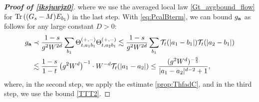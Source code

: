 \begin{proof}[\bf Proof of \eqref{iksjuwjx0}]
where we use the averaged local law \eqref{Gt_avgbound_flow} for $\operatorname{Tr}\left({(G_s-M)E_{b_1}}\right)$ in the last step. With \eqref{eq:PcalBterm}, we can bound $g_{{\mathbf{a}}}$ as follows for any large constant $D>0$:
\begin{align}
g_{{\mathbf{a}}} &\prec \frac{1-s}{g^2W^{2d}} \sum_{b_1} \Theta_{t,a_1b_1}^{(+,-)} \Theta_{t,a_2b_1}^{(+,-)}  \lesssim \frac{1-s}{g^2W^{2d}} \sum_{b_1} \mathcal T_{t}(|a_1-b_1|)\mathcal T_{t}(|a_2-b_1|) \nonumber\\
&\lesssim \frac{1-s}{1-t} \left({g^2W^{d}}\right)^{-1}\cdot W^{-d} \mathcal T_{t}(|a_1-a_2|) \le \frac{(g^2W^{d})^{-\frac65} }{|a_1-a_2|^{d-2}+1},\label{eq:boundga}
\end{align}
where, in the second step, we apply the estimate \eqref{prop:ThfadC}, and in the third step, we use the bound \eqref{TTT2}.



\end{proof}
